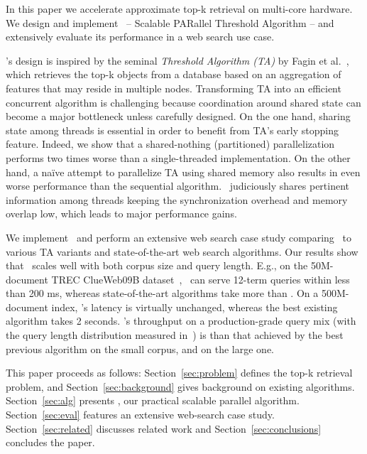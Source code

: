 In this paper we accelerate approximate top-k retrieval on multi-core hardware. 
We design and implement  \emph{\alg}~-- {Scalable PARallel Threshold Algorithm} --  
 and extensively evaluate its performance in 
a web search use case. 

\alg's design is inspired by the seminal \emph{Threshold Algorithm (TA)} by Fagin et al.~\cite{Fagin:2003}, which
retrieves the top-k objects from a database based on an aggregation of features that may reside in multiple nodes. 
Transforming TA into an efficient concurrent algorithm is challenging because coordination around 
shared state can become a major bottleneck unless carefully designed. On the one hand,
sharing state among threads is essential in order to benefit from TA's early stopping feature.
Indeed, we show  that a shared-nothing (partitioned) parallelization  performs two times 
worse than a single-threaded implementation. On the other hand, 
a na\"ive attempt to parallelize TA using shared memory also results in even 
worse performance than the sequential algorithm. \alg\ judiciously shares pertinent
information among threads %
keeping the synchronization 
overhead and memory overlap low, which 
leads to major performance gains. 

We implement \alg\ and perform an extensive web search case study comparing \alg\ to various TA variants and 
state-of-the-art web search algorithms. 
Our results show that \alg\ scales well with both  corpus size and query length.
E.g., on the 50M-document TREC ClueWeb09B dataset~\cite{ClueWeb09}, 
\alg\ can serve  12-term queries within less than 200 ms, 
whereas 
state-of-the-art algorithms  take more than . 
%
On a 500M-document index,  \alg's latency is virtually unchanged, whereas 
the best existing algorithm
 takes 2 seconds. %
 \alg's throughput on a production-grade query mix (with the query length distribution measured in~\cite{sigir/Guy16}) is 
 than that achieved by the best previous algorithm
 on the small corpus, and   on the large one.

This paper proceeds as follows: 
Section~\ref{sec:problem} defines the top-k retrieval problem, and  
Section~\ref{sec:background} gives background on existing algorithms. 
Section~\ref{sec:alg} presents \alg, our practical scalable parallel algorithm. 
Section~\ref{sec:eval}  features an extensive web-search case study.
Section~\ref{sec:related} discusses related work and Section~\ref{sec:conclusions} concludes the paper.
